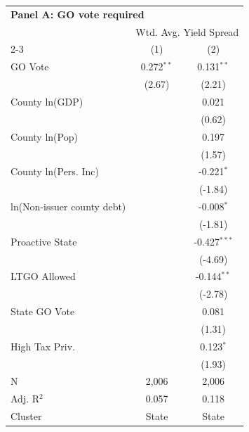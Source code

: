 \begingroup
\centering
\begin{tabular*}{\textwidth}{@{\extracolsep{\fill}}lcc}
\multicolumn{5}{l}{\textbf{Panel A: GO vote required}}\\

\addlinespace
   \toprule
    & \multicolumn{2}{c}{Wtd. Avg. Yield Spread}\\
   \cmidrule(lr){2-3}
                              & (1)          & (2)\\  
   \midrule 
   GO Vote                    & 0.272$^{**}$ & 0.131$^{**}$\\   
                              & (2.67)       & (2.21)\\   
   County ln(GDP)             &              & 0.021\\   
                              &              & (0.62)\\   
   County ln(Pop)             &              & 0.197\\   
                              &              & (1.57)\\   
   County ln(Pers. Inc)       &              & -0.221$^{*}$\\   
                              &              & (-1.84)\\   
   ln(Non-issuer county debt) &              & -0.008$^{*}$\\   
                              &              & (-1.81)\\   
   Proactive State            &              & -0.427$^{***}$\\   
                              &              & (-4.69)\\   
   LTGO Allowed               &              & -0.144$^{**}$\\   
                              &              & (-2.78)\\   
   State GO Vote              &              & 0.081\\   
                              &              & (1.31)\\   
   High Tax Priv.             &              & 0.123$^{*}$\\   
                              &              & (1.93)\\   
   \hline
   N               & 2,006        & 2,006\\  
   Adj. R$^2$             & 0.057        & 0.118\\  
   Cluster              & State & State\\  
   \bottomrule
\end{tabular*}
\par\endgroup
